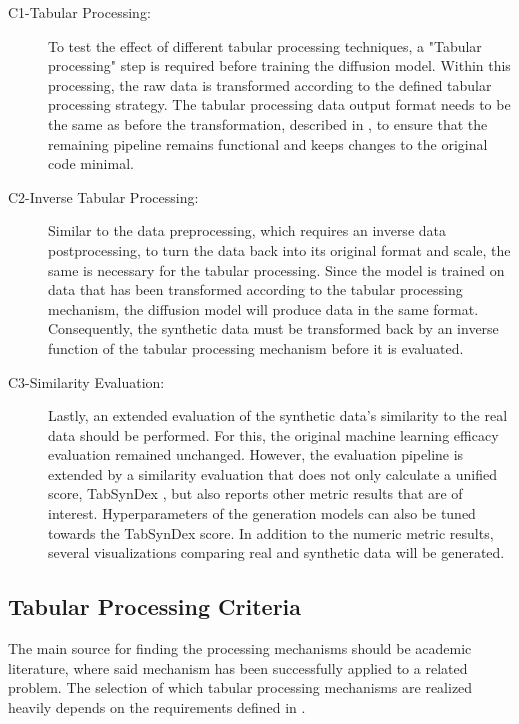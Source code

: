 \begin{description}
	\item[C1-Tabular Processing:] To test the effect of different tabular processing techniques, a "Tabular processing" step is required before training the diffusion \gls{model}.
		Within this processing, the raw data is transformed according to the defined tabular processing strategy.
		The tabular processing data output format needs to be the same as before the transformation, described in , to ensure
		that the remaining pipeline remains functional and keeps changes to the original code minimal.
	\item[C2-Inverse Tabular Processing:] Similar to the data preprocessing, which requires an inverse data postprocessing, to turn the data back into its original format and scale, the same is necessary for the tabular processing.
		Since the \gls{model} is trained on data that has been transformed according to the tabular processing mechanism, the diffusion \gls{model} will produce data in the same format.
		Consequently, the synthetic data must be transformed back by an inverse function of the tabular processing mechanism before it is evaluated.
	\item[C3-Similarity Evaluation:] Lastly, an extended evaluation of the synthetic data's similarity to the real data should be performed.
		For this, the original machine learning efficacy evaluation remained unchanged.
		However, the evaluation pipeline is extended by a similarity evaluation that does not only calculate a unified score, TabSynDex \cite{chundawat2022UniversalMetricRobust}, but also reports other metric results that are of interest.
		Hyperparameters of the generation \glspl{model} can also be tuned towards the TabSynDex score.
		In addition to the numeric metric results, several visualizations comparing real and synthetic data will be generated.
\end{description}

\subsection{Tabular Processing Criteria}
\label{ch:Concept-criteria}

The main source for finding the processing mechanisms should be academic literature, where said mechanism has been successfully applied to a related problem.
The selection of which tabular processing mechanisms are realized heavily depends on the requirements defined in .

